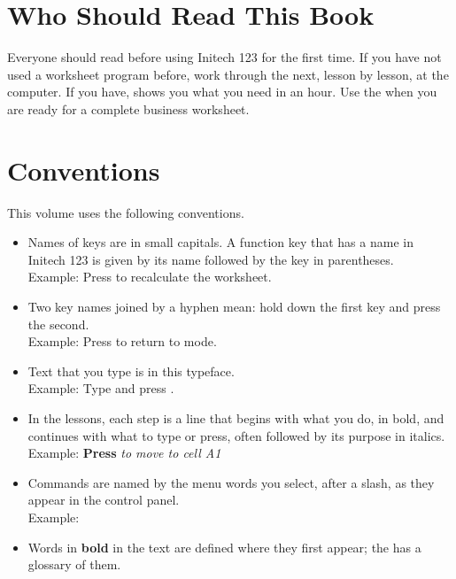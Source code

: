 \section{Who Should Read This Book}
Everyone should read  before using Initech
123 for the first time.  If you have not used a worksheet program before,
work through the  next, lesson by lesson, at the computer.
If you have,  shows you what you need in an hour.  Use
the  when you are ready for a complete
business worksheet.

\section{Conventions}
This volume uses the following conventions.
\begin{itemize}
\item Names of keys are in small capitals.  A function key that has a name
  in Initech 123 is given by its name followed by the key in parentheses.\\
  Example: Press  to recalculate the worksheet.
\item Two key names joined by a hyphen mean: hold down the first key and
  press the second.\\
  Example: Press  to return to  mode.
\item Text that you type is in this typeface.\\
  Example: Type  and press .
\item In the lessons, each step is a line that begins with what you do, in
  bold, and continues with what to type or press, often followed by its
  purpose in italics.\\
  Example: \textbf{Press}\quad{} \textit{to move to cell A1}
\item Commands are named by the menu words you select, after a slash, as
  they appear in the control panel.\\
  Example: 
\item Words in \textbf{bold} in the text are defined where they first
  appear; the  has a glossary of them.
\end{itemize}

